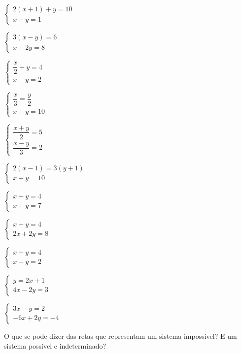 \documentclass[12pt]{article}
\begin{document}
\begin{exercicios}
  \item $\begin{cases} 2(x + 1) + y = 10 \\ x - y = 1 \end{cases}$
  \item $\begin{cases} 3(x - y) = 6 \\ x + 2y = 8 \end{cases}$
  \item $\begin{cases} \dfrac{x}{2} + y = 4 \\ x - y = 2 \end{cases}$
  \item $\begin{cases} \dfrac{x}{3} = \dfrac{y}{2} \\ x + y = 10 \end{cases}$
  \item $\begin{cases} \dfrac{x + y}{2} = 5 \\ \dfrac{x - y}{3} = 2 \end{cases}$
  \item $\begin{cases} 2(x - 1) = 3(y + 1) \\ x + y = 10 \end{cases}$
\end{exercicios}

\begin{exercicios}
  \item $\begin{cases} x + y = 4 \\ x + y = 7 \end{cases}$
  \item $\begin{cases} x + y = 4 \\ 2x + 2y = 8 \end{cases}$
  \item $\begin{cases} x + y = 4 \\ x - y = 2 \end{cases}$
  \item $\begin{cases} y = 2x + 1 \\ 4x - 2y = 3 \end{cases}$
  \item $\begin{cases} 3x - y = 2 \\ -6x + 2y = -4 \end{cases}$
  \item O que se pode dizer das retas que representam um sistema impossível? E um sistema possível e indeterminado?
\end{exercicios}
\end{document}
